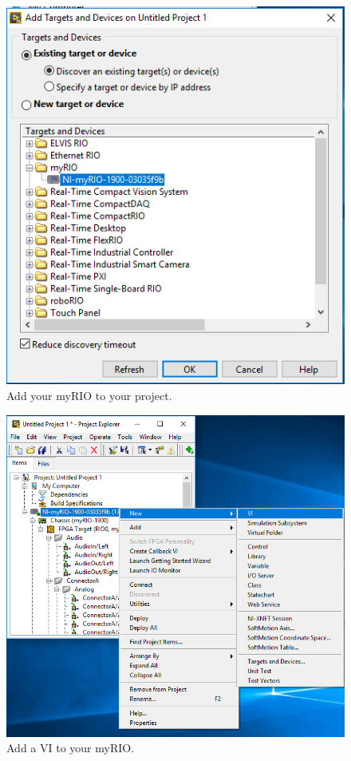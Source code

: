 \documentclass{article}
\begin{document}
\begin{figure}[h!]
\hspace{40mm} 
\includegraphics[scale=0.7]{figs/_2.png}
\caption{Add your myRIO to your project.}
\label{fig:_2}
\end{figure}

\begin{figure}[h!]
\hspace{25mm} 
\includegraphics[scale=0.7]{figs/_3.png}
\caption{Add a VI to your myRIO.}
\label{fig:_3}
\end{figure}
\end{document}
